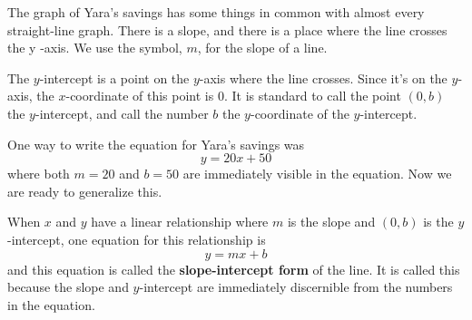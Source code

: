 \documentclass[nooutcomes]{ximera}
\begin{document}
\begin{image}
\end{image}

The graph of Yara's savings has some things in common with almost every straight-line graph. There is a slope, and there is a place where the line crosses the 
y
-axis. We use the symbol, $m$, for the slope of a line. 

\begin{image}
\end{image}


\begin{definition}
The $y$-intercept is a point on the $y$-axis where the line crosses. Since it's on the $y$-axis, the $x$-coordinate of this point is 0.   It is standard to call the point $(0,b)$ the $y$-intercept, and call the number $b$ the $y$-coordinate of the $y$-intercept.
\end{definition}

One way to write the equation for Yara's savings was $$y=20x+50$$ where both $m=20$ and $b=50$ are immediately visible in the equation. Now we are ready to generalize this.


\begin{definition}
When $x$ and $y$ have a linear relationship where $m$  is the slope and $(0,b)$ is the $y$-intercept, one equation for this relationship is $$y=mx+b$$ and this equation is called the \textbf{slope-intercept form} of the line. It is called this because the slope and $y$-intercept are immediately discernible from the numbers in the equation.
\end{definition}
\end{document}
